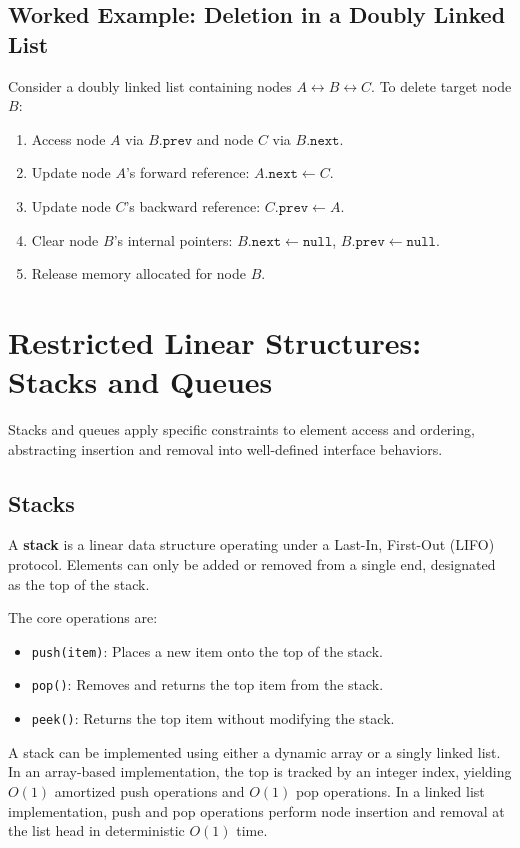 \documentclass[12pt]{report}
\begin{document}
\subsection{Worked Example: Deletion in a Doubly Linked List}

Consider a doubly linked list containing nodes $A \leftrightarrow B \leftrightarrow C$. To delete target node $B$:
\begin{enumerate}
    \item Access node $A$ via $B.\texttt{prev}$ and node $C$ via $B.\texttt{next}$.
    \item Update node $A$'s forward reference: $A.\texttt{next} \leftarrow C$.
    \item Update node $C$'s backward reference: $C.\texttt{prev} \leftarrow A$.
    \item Clear node $B$'s internal pointers: $B.\texttt{next} \leftarrow \texttt{null}$, $B.\texttt{prev} \leftarrow \texttt{null}$.
    \item Release memory allocated for node $B$.
\end{enumerate}

\section{Restricted Linear Structures: Stacks and Queues}

Stacks and queues apply specific constraints to element access and ordering, abstracting insertion and removal into well-defined interface behaviors.

\subsection{Stacks}

A \textbf{stack} is a linear data structure operating under a Last-In, First-Out (LIFO) protocol. Elements can only be added or removed from a single end, designated as the top of the stack.

The core operations are:
\begin{itemize}
    \item \texttt{push(item)}: Places a new item onto the top of the stack.
    \item \texttt{pop()}: Removes and returns the top item from the stack.
    \item \texttt{peek()}: Returns the top item without modifying the stack.
\end{itemize}

A stack can be implemented using either a dynamic array or a singly linked list. In an array-based implementation, the top is tracked by an integer index, yielding $O(1)$ amortized push operations and $O(1)$ pop operations. In a linked list implementation, push and pop operations perform node insertion and removal at the list head in deterministic $O(1)$ time.
\end{document}
